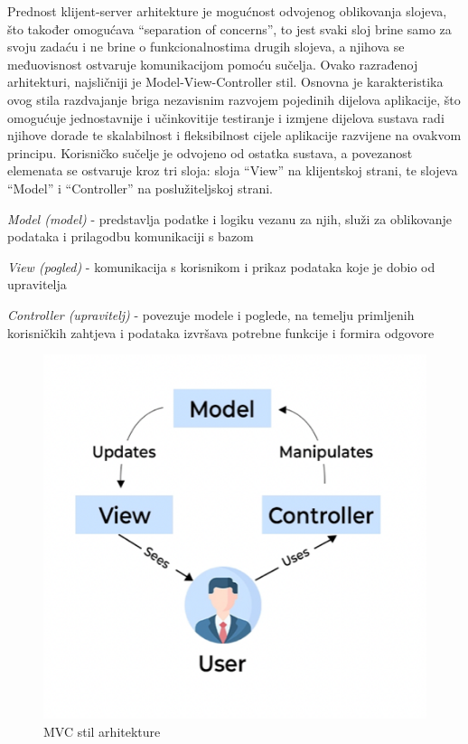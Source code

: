 	
		Prednost klijent-server arhitekture je mogućnost odvojenog oblikovanja slojeva, što također omogućava “separation of concerns”, to jest svaki sloj brine samo za svoju zadaću i ne brine o funkcionalnostima drugih slojeva, a njihova se međuovisnost ostvaruje komunikacijom pomoću sučelja. 
		Ovako razrađenoj arhitekturi, najsličniji je Model-View-Controller stil. Osnovna je karakteristika ovog stila razdvajanje briga nezavisnim razvojem pojedinih dijelova aplikacije, što omogućuje jednostavnije i učinkovitije testiranje i izmjene dijelova sustava radi njihove dorade te skalabilnost i fleksibilnost cijele aplikacije razvijene na ovakvom principu. Korisničko sučelje je odvojeno od ostatka sustava, a povezanost elemenata se ostvaruje kroz tri sloja: sloja “View” na klijentskoj strani, te slojeva “Model” i “Controller” na poslužiteljskoj strani.
	\begin{packed_item}
		

	\item[] \begin{packed_enum}
		\item \textit{Model (model)} - predstavlja podatke i logiku vezanu za njih, služi za oblikovanje podataka i prilagodbu komunikaciji s bazom
		\item \textit{View (pogled)} - komunikacija s korisnikom i prikaz podataka koje je dobio od upravitelja
		\item \textit{Controller (upravitelj)} - povezuje modele i poglede, na temelju primljenih korisničkih zahtjeva i podataka izvršava potrebne funkcije i formira odgovore
		
	\end{packed_enum}
	\end{packed_item}
	
	\begin{figure}[H]
		\includegraphics[scale=0.4]{slike/MVC.png} %
		\centering
		\caption{MVC stil arhitekture}
		\label{fig:mvc}
	\end{figure}
	
